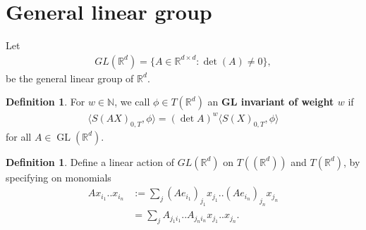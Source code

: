 \documentclass{scrartcl}
\theoremstyle{plain}
\newtheorem{remark}[theorem]{Remark}
\theoremstyle{definition}
\newtheorem{definition}[theorem]{Definition}
\newcommand{\R}{\mathbb{R}}
\newcommand{\N}{\mathbb{N}}
\newcommand{\1}[1]{1_{\{#1\}}}
\newcommand{\ds}{d} %
\newcommand{\TC}{T((\R^\ds))} %
\newcommand{\TS}{T(\R^\ds)} %
\begin{document}
\section{General linear group}
\label{sec:gl}

Let
\begin{align*}
  GL(\R^\ds) = \{ A \in \R^{\ds\times \ds} : \det( A ) \not= 0 \},
\end{align*}
be the general linear group of $\R^\ds$.

\begin{definition}
  \label{def:invariant}
  For $w \in \N$,
  we call $\phi \in \TS$ an \textbf{GL invariant of weight $w$} if
  \begin{align*}
    \Big\langle S(A X)_{0,T}, \phi \Big\rangle = (\det A)^w \Big\langle S(X)_{0,T}, \phi \Big\rangle
  \end{align*}
  for all $A \in \operatorname{GL}(\R^\ds)$.
\end{definition}


%


\begin{definition}
  \label{def:action}
  Define a linear action of $GL(\R^\ds)$ on $\TC$ and $\TS$,
  by specifying on monomials
  \begin{align*}
    A x_{i_1} .. x_{i_n}
    &:=
    \sum_j (A e_{i_1})_{j_1} x_{j_1} .. (A e_{i_n})_{j_n} x_{j_n} \\
    &=
    \sum_j A_{j_1 i_1} .. A_{j_n i_n} x_{j_1} .. x_{j_n}.
  \end{align*}
\end{definition}
\end{document}
